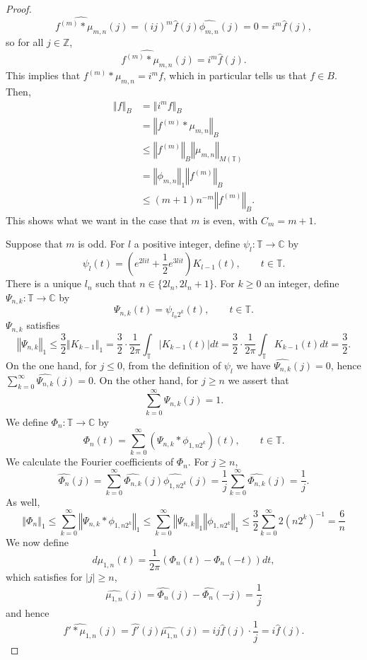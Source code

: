 \documentclass{article}
\newcommand{\norm}[1]{\left\Vert #1 \right\Vert}
\theoremstyle{definition}
\begin{document}
\begin{proof}
\[
\widehat{f^{(m)}*\mu_{m,n}}(j)=(ij)^m \hat{f}(j) \widehat{\phi_{m,n}}(j)=0=i^m \hat{f}(j),
\]
so for all $j \in \mathbb{Z}$,
\[
\widehat{f^{(m)}*\mu_{m,n}}(j)=i^m \hat{f}(j).
\]
This implies that $f^{(m)}*\mu_{m,n}=i^m f$, which in particular tells us that $f \in B$.
Then,
\begin{align*}
\norm{f}_B &= \norm{i^m f}_B\\
&=\norm{f^{(m)}*\mu_{m,n}}_B\\
&\leq \norm{f^{(m)}}_B \norm{\mu_{m,n}}_{M(\mathbb{T})}\\
&=\norm{\phi_{m,n}}_1 \norm{f^{(m)}}_B\\
&\leq (m+1)n^{-m}  \norm{f^{(m)}}_B.
\end{align*}
This shows what we want in the case that $m$ is even, with $C_m=m+1$.

Suppose that $m$ is odd. For $l$ a positive integer, define $\psi_l:\mathbb{T} \to \mathbb{C}$ by
\[
\psi_l(t) = \left(e^{2lit}+\frac{1}{2}e^{3lit} \right) K_{l-1}(t), \qquad  t \in \mathbb{T}.
\]
There is a unique  $l_n$ such that $n \in \{2l_n,2l_n+1\}$. For $k \geq 0$ an integer, define
$\Psi_{n,k}:\mathbb{T} \to \mathbb{C}$ by
\[
\Psi_{n,k}(t) = \psi_{l_n 2^k}(t), \qquad t \in \mathbb{T}.
\]
$\Psi_{n,k}$ satisfies
\[
\norm{\Psi_{n,k}}_1 \leq \frac{3}{2} \norm{K_{k-1}}_1 
=\frac{3}{2} \cdot \frac{1}{2\pi} \int_{\mathbb{T}} |K_{k-1}(t)| dt
=\frac{3}{2} \cdot \frac{1}{2\pi}  \int_{\mathbb{T}} K_{k-1}(t) dt=\frac{3}{2}.
\]
On the one hand,
for $j \leq 0$,
from the definition of $\psi_l$ we have $\widehat{\Psi_{n,k}}(j)=0$, hence
$\sum_{k=0}^\infty \widehat{\Psi_{n,k}}(j)=0$.
On the other hand, for $j \geq n$ we assert that
\[
\sum_{k=0}^\infty \widehat{\Psi_{n,k}}(j)=1.
\]
We define $\Phi_n: \mathbb{T} \to \mathbb{C}$ by
\[
\Phi_n(t) =\sum_{k=0}^\infty (\Psi_{n,k}*\phi_{1,n2^k})(t), \qquad t \in \mathbb{T}.
\]
We calculate the Fourier coefficients of $\Phi_n$. For $j \geq n$, 
\[
\widehat{\Phi_n}(j) = \sum_{k=0}^\infty \widehat{\Phi_{n,k}}(j) \widehat{\phi_{1,n2^k}}(j)
=\frac{1}{j} \sum_{k=0}^\infty   \widehat{\Phi_{n,k}}(j) 
=\frac{1}{j}.
\]
As well,
\[
\norm{\Phi_n}_1 \leq \sum_{k=0}^\infty \norm{\Psi_{n,k}*\phi_{1,n2^k}}_1
\leq \sum_{k=0}^\infty \norm{\Psi_{n,k}}_1 \norm{\phi_{1,n2^k}}_1
\leq \frac{3}{2}  \sum_{k=0}^\infty 2 (n2^k)^{-1}
=\frac{6}{n}
\]
We now define
\[
d\mu_{1,n}(t) = \frac{1}{2\pi} (\Phi_n(t)-\Phi_n(-t)) dt,
\]
which satisfies for $|j| \geq n$,
\[
\widehat{\mu_{1,n}}(j)=\widehat{\Phi_n}(j)-\widehat{\Phi_n}(-j)=\frac{1}{j}
\]
and hence
\[
\widehat{f'*\mu_{1,n}}(j)=\widehat{f'}(j) \widehat{\mu_{1,n}}(j)=ij \hat{f}(j) \cdot \frac{1}{j}=i \hat{f}(j).
\]
\end{proof}
\end{document}
